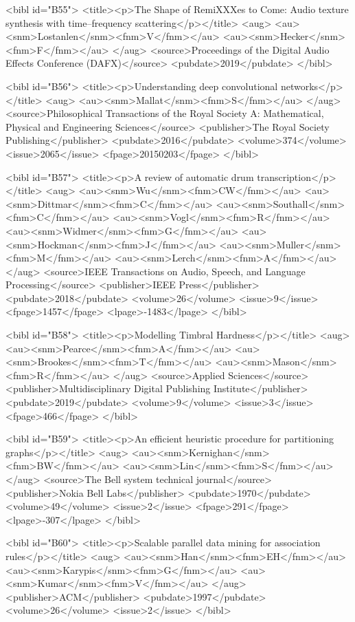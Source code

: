 \documentclass{bmcart}
\begin{document}
\begin{backmatter}
{<bibl id="B55">
  <title><p>The Shape of RemiXXXes to Come: Audio texture synthesis with
  time--frequency scattering</p></title>
  <aug>
    <au><snm>Lostanlen</snm><fnm>V</fnm></au>
    <au><snm>Hecker</snm><fnm>F</fnm></au>
  </aug>
  <source>Proceedings of the Digital Audio Effects Conference (DAFX)</source>
  <pubdate>2019</pubdate>
</bibl>

<bibl id="B56">
  <title><p>Understanding deep convolutional networks</p></title>
  <aug>
    <au><snm>Mallat</snm><fnm>S</fnm></au>
  </aug>
  <source>Philosophical Transactions of the Royal Society A: Mathematical,
  Physical and Engineering Sciences</source>
  <publisher>The Royal Society Publishing</publisher>
  <pubdate>2016</pubdate>
  <volume>374</volume>
  <issue>2065</issue>
  <fpage>20150203</fpage>
</bibl>

<bibl id="B57">
  <title><p>A review of automatic drum transcription</p></title>
  <aug>
    <au><snm>Wu</snm><fnm>CW</fnm></au>
    <au><snm>Dittmar</snm><fnm>C</fnm></au>
    <au><snm>Southall</snm><fnm>C</fnm></au>
    <au><snm>Vogl</snm><fnm>R</fnm></au>
    <au><snm>Widmer</snm><fnm>G</fnm></au>
    <au><snm>Hockman</snm><fnm>J</fnm></au>
    <au><snm>Muller</snm><fnm>M</fnm></au>
    <au><snm>Lerch</snm><fnm>A</fnm></au>
  </aug>
  <source>IEEE Transactions on Audio, Speech, and Language Processing</source>
  <publisher>IEEE Press</publisher>
  <pubdate>2018</pubdate>
  <volume>26</volume>
  <issue>9</issue>
  <fpage>1457</fpage>
  <lpage>-1483</lpage>
</bibl>

<bibl id="B58">
  <title><p>Modelling Timbral Hardness</p></title>
  <aug>
    <au><snm>Pearce</snm><fnm>A</fnm></au>
    <au><snm>Brookes</snm><fnm>T</fnm></au>
    <au><snm>Mason</snm><fnm>R</fnm></au>
  </aug>
  <source>Applied Sciences</source>
  <publisher>Multidisciplinary Digital Publishing Institute</publisher>
  <pubdate>2019</pubdate>
  <volume>9</volume>
  <issue>3</issue>
  <fpage>466</fpage>
</bibl>

<bibl id="B59">
  <title><p>An efficient heuristic procedure for partitioning
  graphs</p></title>
  <aug>
    <au><snm>Kernighan</snm><fnm>BW</fnm></au>
    <au><snm>Lin</snm><fnm>S</fnm></au>
  </aug>
  <source>The Bell system technical journal</source>
  <publisher>Nokia Bell Labs</publisher>
  <pubdate>1970</pubdate>
  <volume>49</volume>
  <issue>2</issue>
  <fpage>291</fpage>
  <lpage>-307</lpage>
</bibl>

<bibl id="B60">
  <title><p>Scalable parallel data mining for association rules</p></title>
  <aug>
    <au><snm>Han</snm><fnm>EH</fnm></au>
    <au><snm>Karypis</snm><fnm>G</fnm></au>
    <au><snm>Kumar</snm><fnm>V</fnm></au>
  </aug>
  <publisher>ACM</publisher>
  <pubdate>1997</pubdate>
  <volume>26</volume>
  <issue>2</issue>
</bibl>

}
\end{backmatter}
\end{document}
